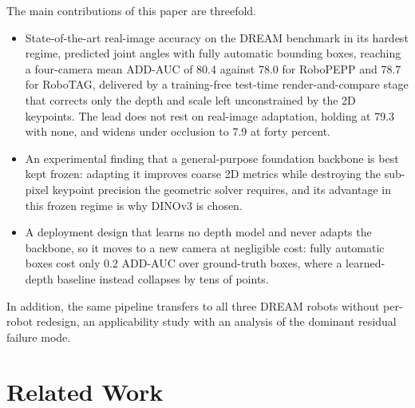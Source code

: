 The main contributions of this paper are threefold.
\begin{itemize}
  \item State-of-the-art real-image accuracy on the DREAM benchmark in its hardest regime, predicted joint angles with fully automatic bounding boxes, reaching a four-camera mean ADD-AUC of 80.4 against 78.0 for RoboPEPP and 78.7 for RoboTAG, delivered by a training-free test-time render-and-compare stage that corrects only the depth and scale left unconstrained by the 2D keypoints. The lead does not rest on real-image adaptation, holding at 79.3 with none, and widens under occlusion to 7.9 at forty percent.
  \item An experimental finding that a general-purpose foundation backbone is best kept frozen: adapting it improves coarse 2D metrics while destroying the sub-pixel keypoint precision the geometric solver requires, and its advantage in this frozen regime is why DINOv3 is chosen.
  \item A deployment design that learns no depth model and never adapts the backbone, so it moves to a new camera at negligible cost: fully automatic boxes cost only 0.2 ADD-AUC over ground-truth boxes, where a learned-depth baseline instead collapses by tens of points.
\end{itemize}
In addition, the same pipeline transfers to all three DREAM robots without per-robot redesign, an applicability study with an analysis of the dominant residual failure mode.



\section{Related Work}
\label{sec:related}

